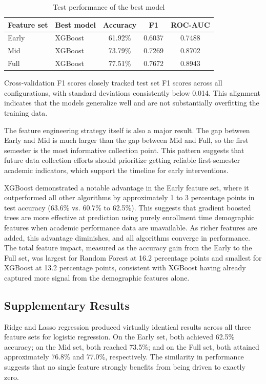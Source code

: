 \documentclass[11pt]{article}
\begin{document}
\begin{table}[h]
\centering
\begin{tabular}{l l c c c}
\toprule
Feature set & Best model & Accuracy & F1 & ROC-AUC \\
\midrule
Early & XGBoost & 61.92\% & 0.6037 & 0.7488 \\
Mid & XGBoost & 73.79\% & 0.7269 & 0.8702 \\
Full & XGBoost & 77.51\% & 0.7672 & 0.8943 \\
\bottomrule
\end{tabular}
\caption{Test performance of the best model}
\end{table}

Cross-validation F1 scores closely tracked test set F1 scores across all configurations, with standard deviations consistently below 0.014. This alignment indicates that the models generalize well and are not substantially overfitting the training data.

The feature engineering strategy itself is also a major result. The gap between Early and Mid is much larger than the gap between Mid and Full, so the first semester is the most informative collection point. This pattern suggests that future data collection efforts should prioritize getting reliable first-semester academic indicators, which support the timeline for early interventions. 

XGBoost demonstrated a notable advantage in the Early feature set, where it outperformed all other algorithms by approximately 1 to 3 percentage points in test accuracy (63.6\% vs. 60.7\% to 62.5\%). This suggests that gradient boosted trees are more effective at prediction using purely enrollment time demographic features when academic performance data are unavailable. As richer features are added, this advantage diminishes, and all algorithms converge in performance. The total feature impact, measured as the accuracy gain from the Early to the Full set, was largest for Random Forest at 16.2 percentage points and smallest for XGBoost at 13.2 percentage points, consistent with XGBoost having already captured more signal from the demographic features alone.


\subsection{Supplementary Results}

Ridge and Lasso regression produced virtually identical results across all three feature sets for logistic regression. On the Early set, both achieved 62.5\% accuracy; on the Mid set, both reached 73.5\%; and on the Full set, both attained approximately 76.8\% and 77.0\%, respectively. The similarity in performance suggests that no single feature strongly benefits from being driven to exactly zero.
\end{document}
